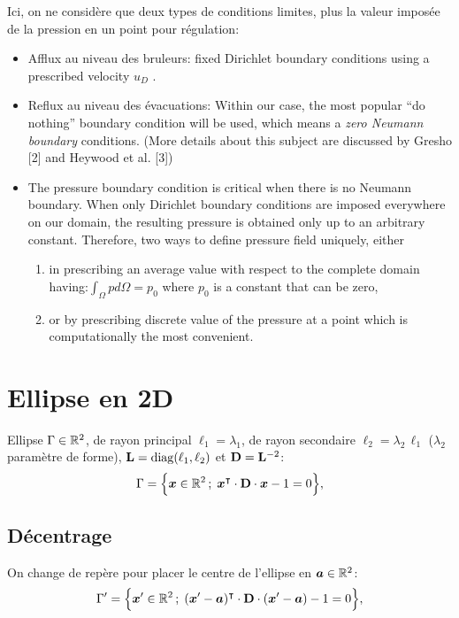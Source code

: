 \documentclass[10pt,a4paper]{article}
\begin{document}
Ici, on ne considère que deux types de conditions limites, plus la valeur imposée de la pression en un point pour régulation:
%
\begin{itemize}
\item Afflux au niveau des bruleurs: fixed Dirichlet boundary conditions using a prescribed velocity $u_D$ .
\item Reflux au niveau des évacuations: Within our case, the most popular “do nothing” boundary condition will be used, which means a \emph{zero Neumann boundary} conditions. (More details about this subject are discussed by Gresho [2] and
Heywood et al. [3])
\item The pressure boundary condition is critical when there is no Neumann boundary.
When only Dirichlet boundary conditions are imposed everywhere on our domain, the
resulting pressure is obtained only up to an arbitrary constant. Therefore, two ways to
define pressure field uniquely, either 
\begin{enumerate}
\item in prescribing an average value with respect to the complete domain having:$\int_\Omega p d\Omega = p_0$
 where $p_0$ is a constant that can be zero,
 \item  or by prescribing discrete value of the pressure at a point which is computationally the most convenient.
\end{enumerate}
\end{itemize}
%
%
%
\newpage
\section{Ellipse en 2D}
%
Ellipse $\Gamma \in \mathbb{R}^2$, de rayon principal $\ell_1=\lambda_1$, de rayon secondaire $\ell_2=\lambda_2\,\ell_1$ ($\lambda_2$ paramètre de forme), $\mathbf{L}=\mathrm{diag}(\ell_1, \ell_2)$ et $\mathbf{D} = \mathbf{L}^{-2}$:
\begin{equation}
\Gamma = \Big\{\boldsymbol{x} \in \mathbb{R}^2\,;\; \boldsymbol{x}^\intercal\cdot\mathbf{D}\cdot\boldsymbol{x}-1=0\Big\},
\end{equation}
%
\subsection{Décentrage}
%
%
On change de repère pour placer le centre de l'ellipse en $\boldsymbol{a} \in \mathbb{R}^2$:
\begin{equation}
\Gamma^\prime = \Big\{\boldsymbol{x}^\prime \in \mathbb{R}^2\,;\; (\boldsymbol{x}^\prime-\boldsymbol{a})^\intercal\cdot\mathbf{D}\cdot(\boldsymbol{x}^\prime-\boldsymbol{a})-1=0\Big\},
\end{equation}
\end{document}
